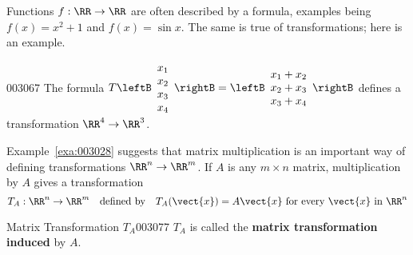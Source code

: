 Functions $f : \RR \to \RR$ are often described by a formula, examples being $f(x) = x^{2} + 1$ and $f(x) = \sin x$. The same is true of transformations; here is an example.

\begin{example}{}{003067}
The formula $T \leftB \begin{array}{c}
x_{1} \\
x_{2} \\
x_{3} \\ 
x_{4}
\end{array} \rightB = \leftB \begin{array}{c}
x_{1} + x_{2} \\
x_{2} + x_{3} \\
x_{3} + x_{4} 
\end{array} \rightB$
 defines a transformation $\RR^4 \to \RR^3$.
\end{example}

Example~\ref{exa:003028} suggests that matrix multiplication is an important way of defining transformations $\RR^n \to \RR^m$. If $A$ is any $m \times n$ matrix, multiplication by $A$ gives a transformation
\begin{equation*}
T_{A} : \RR^{n} \to \RR^{m} \quad \mbox{defined by} \quad T_{A}(\vect{x}) = A\vect{x} \mbox{ for every } \vect{x} \mbox{ in } \RR^{n}
\end{equation*}
\begin{definition}{Matrix Transformation $T_A$}{003077}
$T_{A}$ is called the \textbf{matrix transformation induced} by $A$.
\end{definition}

